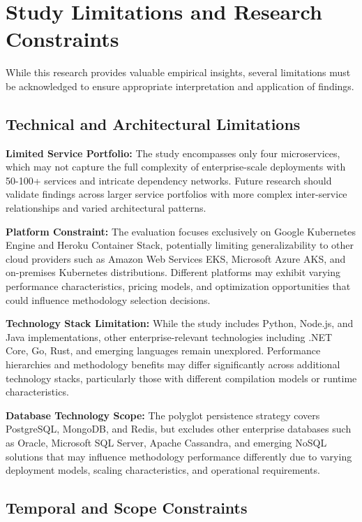 \section{Study Limitations and Research Constraints}
\label{sec:study_limitations}

While this research provides valuable empirical insights, several limitations must be acknowledged to ensure appropriate interpretation and application of findings.

\subsection{Technical and Architectural Limitations}
\label{subsec:technical_limitations}

\textbf{Limited Service Portfolio:} The study encompasses only four microservices, which may not capture the full complexity of enterprise-scale deployments with 50-100+ services and intricate dependency networks. Future research should validate findings across larger service portfolios with more complex inter-service relationships and varied architectural patterns.

\textbf{Platform Constraint:} The evaluation focuses exclusively on Google Kubernetes Engine and Heroku Container Stack, potentially limiting generalizability to other cloud providers such as Amazon Web Services EKS, Microsoft Azure AKS, and on-premises Kubernetes distributions. Different platforms may exhibit varying performance characteristics, pricing models, and optimization opportunities that could influence methodology selection decisions.

\textbf{Technology Stack Limitation:} While the study includes Python, Node.js, and Java implementations, other enterprise-relevant technologies including .NET Core, Go, Rust, and emerging languages remain unexplored. Performance hierarchies and methodology benefits may differ significantly across additional technology stacks, particularly those with different compilation models or runtime characteristics.

\textbf{Database Technology Scope:} The polyglot persistence strategy covers PostgreSQL, MongoDB, and Redis, but excludes other enterprise databases such as Oracle, Microsoft SQL Server, Apache Cassandra, and emerging NoSQL solutions that may influence methodology performance differently due to varying deployment models, scaling characteristics, and operational requirements.

\subsection{Temporal and Scope Constraints}
\label{subsec:temporal_constraints}


